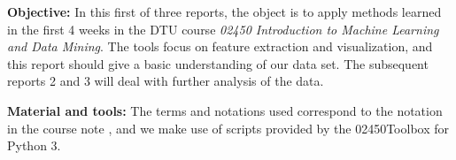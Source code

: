 \textbf{Objective:} In this first of three reports, the object is to apply methods learned in the first 4 weeks in the DTU course \textit{02450 Introduction to Machine Learning and Data Mining}. The tools focus on feature extraction and visualization, and this report should give a basic understanding of our data set. The subsequent reports 2 and 3 will deal with further analysis of the data.

\textbf{Material and tools:} The terms and notations used correspond to the notation in the course note \cite{coursenotes}, and we make use of scripts provided by the 02450Toolbox for Python 3.
